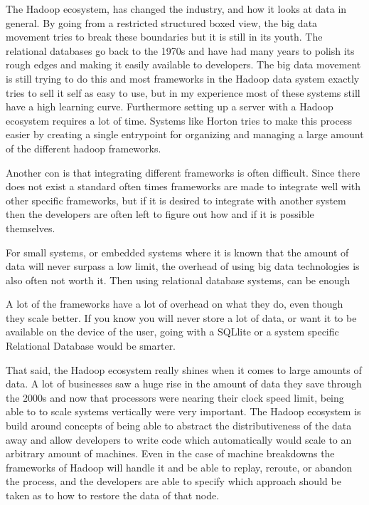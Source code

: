 The Hadoop ecosystem, has changed the industry, and how it looks at data in general. By going from a restricted structured boxed view, the big data movement tries to break these boundaries but it is still in its youth. The relational databases go back to the 1970s and have had many years to polish its rough edges and making it easily available to developers. The big data movement is still trying to do this and most frameworks in the Hadoop data system exactly tries to sell it self as easy to use, but in my experience most of these systems still have a high learning curve. Furthermore setting up a server with a Hadoop ecosystem requires a lot of time. Systems like Horton tries to make this process easier by creating a single entrypoint for organizing and managing a large amount of the different hadoop frameworks. 

Another con is that integrating different frameworks is often difficult. Since there does not exist a standard often times frameworks are made to integrate well with other specific frameworks, but if it is desired to integrate with another system then the developers are often left to figure out how and if it is possible themselves.

For small systems, or embedded systems where it is known that the amount of data will never surpass a low limit, the overhead of using big data technologies is also often not worth it. Then using relational database systems, can be enough 

A lot of the frameworks have a lot of overhead on what they do, even though they scale better. If you know you will never store a lot of data, or want it to be available on the device of the user, going with a SQLlite or a system specific Relational Database would be smarter.

That said, the Hadoop ecosystem really shines when it comes to large amounts of data. A lot of businesses saw a huge rise in the amount of data they save through the 2000s and now that processors were nearing their clock speed limit, being able to to scale systems vertically were very important. The Hadoop ecosystem is build around concepts of being able to abstract the distributiveness of the data away and allow developers to write code which automatically would scale to an arbitrary amount of machines. Even in the case of machine breakdowns the frameworks of Hadoop will handle it and be able to replay, reroute, or abandon the process, and the developers are able to specify which approach should be taken as to how to restore the data of that node.
